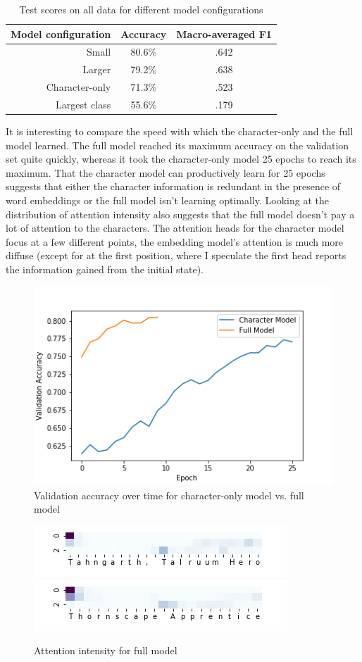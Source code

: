 \documentclass[letterpaper]{article} %
\begin{document}
\begin{table}
  \centering
  \caption{Test scores on all data for different model configurations}
  \begin{tabular}{r | c | c}
    Model configuration & Accuracy & Macro-averaged F1 \\
    \hline
    Small & 80.6\% &  .642 \\
    Larger & 79.2\% & .638 \\
    Character-only & 71.3\% & .523 \\
    Largest class & 55.6\% & .179 \\
  \end{tabular}
\end{table}

It is interesting to compare the speed with which the character-only
and the full model learned.
The full model reached its maximum accuracy on the validation set quite quickly,
whereas it took the character-only model 25 epochs to reach its maximum.
That the character model can productively learn for 25 epochs
suggests that either the character information is redundant
in the presence of word embeddings
or the full model isn't learning optimally.
Looking at the distribution of attention intensity
also suggests that the full model doesn't pay a lot of attention to the characters.
The attention heads for the character model focus at a few different points,
the embedding model's attention is much more diffuse
(except for at the first position,
where I speculate the first head reports
the information gained from the initial state).

\begin{figure}
  \includegraphics[width=.5\textwidth]{training-speed-comparison}
  \caption{Validation accuracy over time for character-only model vs. full model}
\end{figure}

\begin{figure}
  \includegraphics[width=.5\textwidth]{tahngarth-attention-wv}
  \includegraphics[width=.5\textwidth]{thornscape-attention-wv}
  \caption{Attention intensity for full model}
\end{figure}
\end{document}
